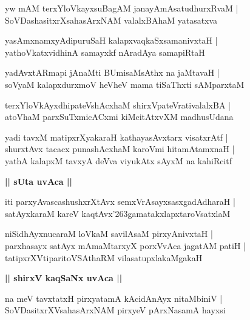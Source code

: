 \documentclass[twoside,12pt,openright]{book}
\def\S{\char'263}
\newcounter{shloka}[chapter]
\def\uvaca#1{\centerline{{\large\textbf{#1}}}}
\begin{document}
\begin{shloka}%
yw mAM terxYloVkayxsuBagAM janayAmAsatudhurxRvaM |\\
SoVDashasitxrXsahasArxNAM valalxBAhaM yatasatxva
\end{shloka}

\begin{shloka}%
yasAmxnamxyAdipuruSaH kalapxvaqkaSxsamanivxtaH |\\
yathoVkatxvidhinA samayxkf nAradAya samapiRtaH 
\end{shloka}

\begin{shloka}%
yadAvxtARmapi jAnaMti BUmisaMsAthx na jaMtavaH |\\
soVyaM kalapxdurxmoV heVheV mama tiSaThxti sAMparxtaM 
\end{shloka}

\begin{shloka}%
terxYloVkAyxdhipateVshAcxhaM shirxVpateVrativalalxBA |\\
atoVhaM parxSuTxmicACxmi kiMcitAtxvXM madhusUdana
\end{shloka}

\begin{shloka}%
yadi tavxM matipxrXyakaraH kathayasAvxtarx visatxrAtf |\\
shurxtAvx tacacx punashAcxhaM karoVmi hitamAtamxnaH |\\
yathA kalapxM tavxyA deVva viyukAtx sAyxM na kahiRcitf
\end{shloka}

\uvaca{|| sUta uvAca ||}

\begin{shloka}%
iti parxyAvascashushxrXtAvx semxVrAsayxsasxgadAdharaH |\\
satAyxkaraM kareV kaqtAvx\S gamatakxlapxtaroVsatxlaM
\end{shloka}

\begin{shloka}%
niSidhAyxnucaraM loVkaM savilAsaM pirxyAnivxtaH |\\
parxhasayx satAyx mAmaMtarxyX porxVvAca jagatAM patiH |\\
tatipxrXVtiparitoVSAthaRM vilasatupxlakaMgakaH 
\end{shloka}

\uvaca{|| shirxV kaqSaNx uvAca ||}

\begin{shloka}%
na meV tavxtatxH pirxyatamA kAcidAnAyx nitaMbiniV |\\
SoVDasitxrXVsahasArxNAM pirxyeV pArxNasamA hayxsi
\end{shloka}
\end{document}
